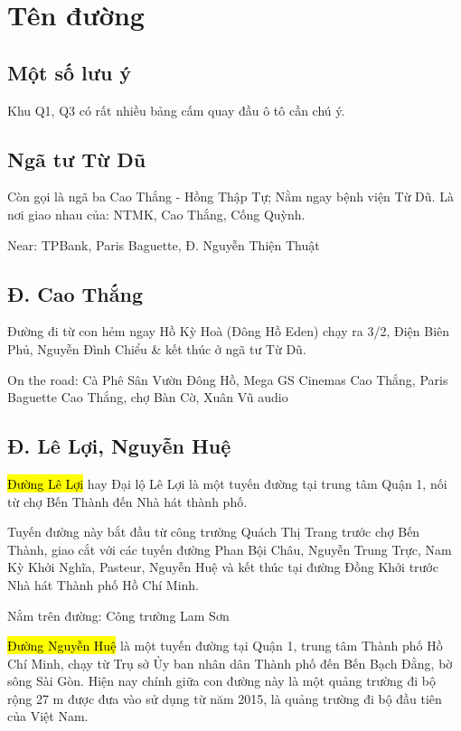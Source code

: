 \chapter{Tên đường}

\section{Một số lưu ý}

Khu Q1, Q3 có rất nhiều bảng cấm quay đầu ô tô cần chú ý.

\section{Ngã tư Từ Dũ}

Còn gọi là ngã ba Cao Thắng - Hồng Thập Tự; Nằm ngay bệnh viện Từ Dũ. Là nơi giao nhau của: NTMK, Cao Thắng, Cống Quỳnh.

Near: TPBank, Paris Baguette, Đ. Nguyễn Thiện Thuật

\section{Đ. Cao Thắng}

Đường đi từ con hẻm ngay Hồ Kỳ Hoà (Đông Hồ Eden) chạy ra 3/2, Điện Biên Phủ, Nguyễn Đình Chiểu \& kết thúc ở ngã tư Từ Dũ.

On the road: Cà Phê Sân Vườn Đông Hồ, Mega GS Cinemas Cao Thắng, Paris Baguette Cao Thắng, chợ Bàn Cờ, Xuân Vũ audio

\section{Đ. Lê Lợi, Nguyễn Huệ}

\hl{Đường Lê Lợi} hay Đại lộ Lê Lợi là một tuyến đường tại trung tâm Quận 1, nối từ chợ Bến Thành đến Nhà hát thành phố.

Tuyến đường này bắt đầu từ công trường Quách Thị Trang trước chợ Bến Thành, giao cắt với các tuyến đường Phan Bội Châu, Nguyễn Trung Trực, Nam Kỳ Khởi Nghĩa, Pasteur, Nguyễn Huệ và kết thúc tại đường Đồng Khởi trước Nhà hát Thành phố Hồ Chí Minh.

Nằm trên đường: Công trường Lam Sơn

\threestars

\hl{Đường Nguyễn Huệ} là một tuyến đường tại Quận 1, trung tâm Thành phố Hồ Chí Minh, chạy từ Trụ sở Ủy ban nhân dân Thành phố đến Bến Bạch Đằng, bờ sông Sài Gòn. Hiện nay chính giữa con đường này là một quảng trường đi bộ rộng 27 m được đưa vào sử dụng từ năm 2015, là quảng trường đi bộ đầu tiên của Việt Nam.

